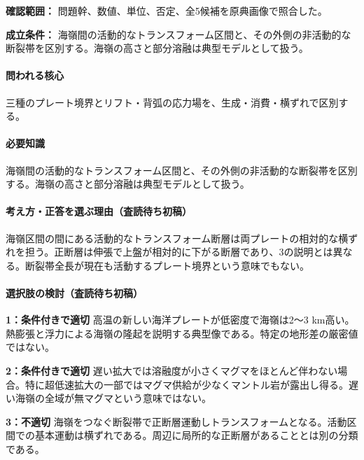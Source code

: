 \noindent\textbf{確認範囲：} 問題幹、数値、単位、否定、全5候補を原典画像で照合した。\par

\noindent\textbf{成立条件：} 海嶺間の活動的なトランスフォーム区間と、その外側の非活動的な断裂帯を区別する。海嶺の高さと部分溶融は典型モデルとして扱う。\par

\paragraph{問われる核心} 三種のプレート境界とリフト・背弧の応力場を、生成・消費・横ずれで区別する。

\paragraph{必要知識} 海嶺間の活動的なトランスフォーム区間と、その外側の非活動的な断裂帯を区別する。海嶺の高さと部分溶融は典型モデルとして扱う。

\paragraph{考え方・正答を選ぶ理由（査読待ち初稿）} 海嶺区間の間にある活動的なトランスフォーム断層は両プレートの相対的な横ずれを担う。正断層は伸張で上盤が相対的に下がる断層であり、3の説明とは異なる。断裂帯全長が現在も活動するプレート境界という意味でもない。

\paragraph{選択肢の検討（査読待ち初稿）}\mbox{}\par

\noindent\textbf{1：条件付きで適切} 高温の新しい海洋プレートが低密度で海嶺は2〜3 km高い。熱膨張と浮力による海嶺の隆起を説明する典型像である。特定の地形差の厳密値ではない。\par

\noindent\textbf{2：条件付きで適切} 遅い拡大では溶融度が小さくマグマをほとんど伴わない場合。特に超低速拡大の一部ではマグマ供給が少なくマントル岩が露出し得る。遅い海嶺の全域が無マグマという意味ではない。\par

\noindent\textbf{3：不適切} 海嶺をつなぐ断裂帯で正断層運動しトランスフォームとなる。活動区間での基本運動は横ずれである。周辺に局所的な正断層があることとは別の分類である。\par

